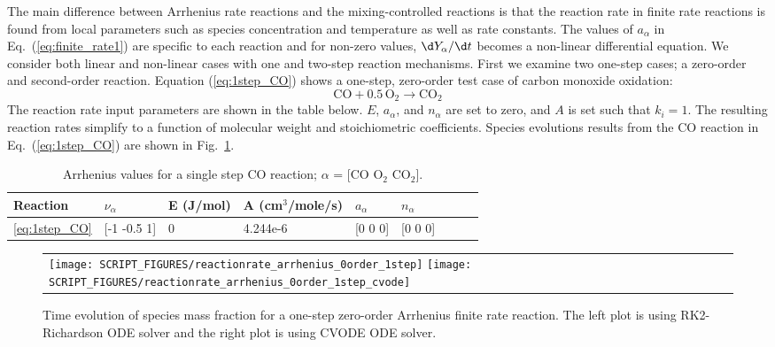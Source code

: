 \documentclass[11pt]{book}
\begin{document}
The main difference between Arrhenius rate reactions and the mixing-controlled reactions is that the reaction rate in finite rate reactions is found from local parameters such as species concentration and temperature as well as rate constants. The values of $a_{\alpha}$ in Eq.~(\ref{eq:finite_rate1}) are specific to each reaction and for non-zero values, $\d Y_{\alpha}/ \d t$ becomes  a non-linear differential equation. We consider both linear and non-linear cases with one and two-step reaction mechanisms. First we examine two one-step cases; a zero-order and second-order reaction. Equation (\ref{eq:1step_CO}) shows a one-step, zero-order test case of carbon monoxide oxidation:
\begin{equation}\label{eq:1step_CO}
\mathrm{CO+0.5 \, O_2 \rightarrow  CO_2}
\end{equation}
The reaction rate input parameters are shown in the table below. $E$, $a_{\alpha}$, and $n_{\alpha}$ are set to zero, and $A$ is set such that ${k}_{i} = 1$. The resulting reaction rates simplify to a function of molecular weight and stoichiometric coefficients. Species evolutions results from the CO reaction in Eq.~(\ref{eq:1step_CO}) are shown in Fig.~\ref{fig:Arrhenius_0Order_1step}.
\begin{table}[ht]
\begin{center}
\caption[Arrhenius values for a single step CO reaction]{Arrhenius values for a single step CO reaction; $\alpha$ = [$\mathrm{CO}$ $\mathrm{O_2}$ $\mathrm{CO_2}$].}
\label{single_step_co}
\begin{tabular}{|l|l|l|l|l|l|l|l|l|}
\hline Reaction & $\nu_{\alpha}$ & E (J/mol) & A (cm$^3$/mole/s) & $a_{\alpha}$ & $n_{\alpha}$  \\ \hline \hline
\ref{eq:1step_CO} & [-1 -0.5 1] & 0 & 4.244e-6 & [0 0 0] & [0 0 0] \\ \hline
\end{tabular}
\end{center}
\end{table}
\begin{figure}[h!]
\centering
\begin{tabular*}{\textwidth}{lr}
\texttt{[image: SCRIPT\_FIGURES/reactionrate\_arrhenius\_0order\_1step]}
\texttt{[image: SCRIPT\_FIGURES/reactionrate\_arrhenius\_0order\_1step\_cvode]}
\end{tabular*}
\caption[Species evolution in a 0-order 1-step finite rate reaction]{Time evolution of species mass fraction for a one-step zero-order Arrhenius finite rate reaction. The left plot is using RK2-Richardson ODE solver and the right plot is using CVODE ODE solver.}
\label{fig:Arrhenius_0Order_1step}
\end{figure}
\end{document}
